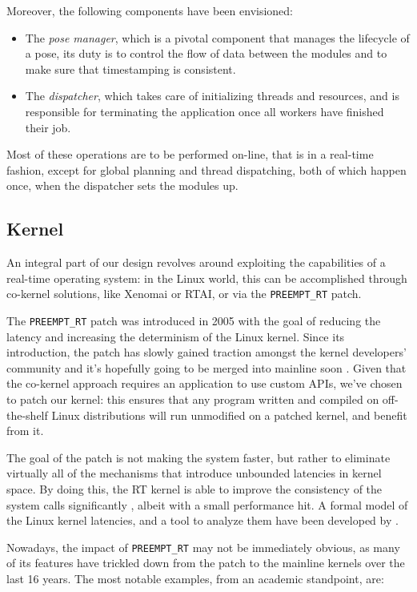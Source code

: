 \documentclass[a4paper,12pt]{report}
\begin{document}
Moreover, the following components have been envisioned:
\begin{itemize}
  \item The \textit{pose manager}, which is a pivotal component that manages the lifecycle of a pose, its duty is to control the flow of data between the modules and to make sure that timestamping is consistent.
  \item The \textit{dispatcher}, which takes care of initializing threads and resources, and is responsible for terminating the application once all workers have finished their job.
\end{itemize}

Most of these operations are to be performed on-line, that is in a real-time fashion, except for global planning and thread dispatching, both of which happen once, when the dispatcher sets the modules up.

\subsection{Kernel}

An integral part of our design revolves around exploiting the capabilities of a real-time operating system: in the Linux world, this can be accomplished through co-kernel solutions, like Xenomai or RTAI, or via the \texttt{PREEMPT\_RT} patch.

The \texttt{PREEMPT\_RT} patch was introduced in 2005 with the goal of reducing the latency and increasing the determinism of the Linux kernel. Since its introduction, the patch has slowly gained traction amongst the kernel developers' community and it's hopefully going to be merged into mainline soon \cite{lwn-rt-future}. Given that the co-kernel approach requires an application to use custom APIs, we've chosen to patch our kernel: this ensures that any program written and compiled on off-the-shelf Linux distributions will run unmodified on a patched kernel, and benefit from it.

The goal of the patch is not making the system faster, but rather to eliminate virtually all of the mechanisms that introduce unbounded latencies in kernel space. By doing this, the RT kernel is able to improve the consistency of the system calls significantly \cite{dmoceri-benchmarking-rtlinux}, albeit with a small performance hit. A formal model of the Linux kernel latencies, and a tool to analyze them have been developed by \textcite{demistifying-rt-latency}.

Nowadays, the impact of \texttt{PREEMPT\_RT} may not be immediately obvious, as many of its features have trickled down from the patch to the mainline kernels over the last 16 years. The most notable examples, from an academic standpoint, are:
\end{document}
